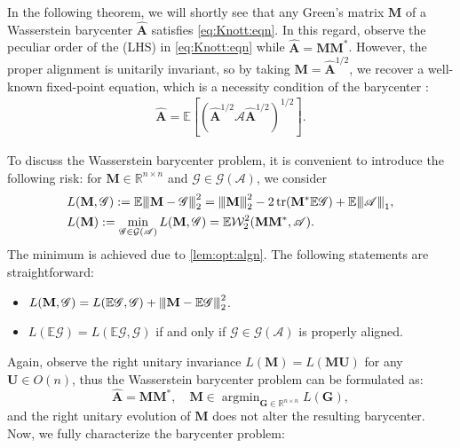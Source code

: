 \documentclass[noinfoline]{imsart}\setcounter{tocdepth}{2}
\renewcommand{\b}[1]{\mathbb{#1}} %
\newcommand{\m}[1]{\mathbf{#1}} %
\newcommand{\s}[1]{\mathscr{#1}} %
\renewcommand{\c}[1]{\mathcal{#1}} %
\DeclareMathOperator*{\tr}{tr}
\DeclareMathOperator*{\argmin}{\arg\min}
\newcommand{\vertii}[1]{{\vert\kern-0.25ex\vert\kern-0.25ex\vert #1 
    \vert\kern-0.25ex\vert\kern-0.25ex\vert}} %
\theoremstyle{plain}
\begin{document}
In the following theorem, we will shortly see that any Green's matrix $\m{M}$ of a Wasserstein barycenter $\hat{\m{A}}$ satisfies \eqref{eq:Knott:eqn}. In this regard, observe the peculiar order of the (LHS) in \eqref{eq:Knott:eqn} while $\hat{\m{A}} = \m{M} \m{M}^{*}$. However, the proper alignment is unitarily invariant, so by taking $\m{M} = \hat{\m{A}}^{1/2}$, we recover a well-known fixed-point equation, which is a necessity condition of the barycenter \cite{knott1984optimal,agueh2011barycenters,ruschendorf2002n,masarotto2019procrustes,kroshnin2021statistical,alvarez2016fixed}:
\begin{align}\label{eq:knott:neces}
    \hat{\m{A}} = \b{E}[(\hat{\m{A}}^{1/2} \s{A} \hat{\m{A}}^{1/2})^{1/2}].
\end{align}

To discuss the Wasserstein barycenter problem, it is convenient to introduce the following risk: for $\m{M} \in \b{R}^{n \times n}$ and $\s{G} \in \c{G}(\s{A})$, we consider
\begin{align*}
    &L(\m{M}, \s{G}) := \b{E} \vertii{\m{M} - \s{G}}_{2}^{2} = \vertii{\m{M}}_{2}^{2} - 2 \tr(\m{M}^{*} \b{E} \s{G}) + \b{E} \vertii{\s{A}}_{1}, \\
    &L(\m{M}) := \min_{\s{G} \in \c{G}(\s{A})} L(\m{M}, \s{G}) = \b{E} \c{W}_{2}^{2}(\m{M} \m{M}^{*}, \s{A}).
\end{align*}
The minimum is achieved due to \cref{lem:opt:algn}. The following statements are straightforward:
\begin{itemize}
    \item $L(\m{M}, \s{G}) = L(\b{E} \s{G}, \s{G}) + \vertii{\m{M} - \b{E} \s{G}}_{2}^{2}$.
    \item $L(\b{E} \s{G}) = L(\b{E} \s{G}, \s{G})$ if and only if $\s{G} \in \c{G}(\s{A})$ is properly aligned.
\end{itemize}
Again, observe the right unitary invariance $L(\m{M}) = L(\m{M} \m{U})$ for any $\m{U} \in O(n)$, thus the Wasserstein barycenter problem can be formulated as:
\begin{equation*}
    \hat{\m{A}} = \m{M} \m{M}^{*}, \quad \m{M} \in \argmin_{\m{G} \in \b{R}^{n \times n}} L(\m{G}),
\end{equation*}
and the right unitary evolution of $\m{M}$ does not alter the resulting barycenter. Now, we fully characterize the barycenter problem:
\end{document}
